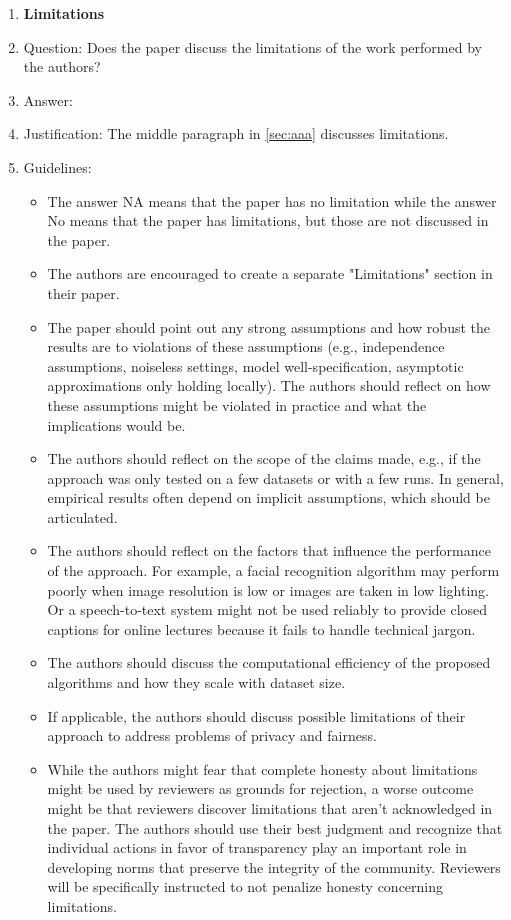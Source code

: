 \documentclass{article}
\theoremstyle{plain}
\theoremstyle{definition}
\theoremstyle{remark}
\theoremstyle{remark}
\begin{document}
\begin{enumerate}
\item {\bf Limitations}
    \item[] Question: Does the paper discuss the limitations of the work performed by the authors?
    \item[] Answer: \answerYes{} %
    \item[] Justification: The middle paragraph in \autoref{sec:aaa} discusses limitations.
    \item[] Guidelines:
    \begin{itemize}
        \item The answer NA means that the paper has no limitation while the answer No means that the paper has limitations, but those are not discussed in the paper. 
        \item The authors are encouraged to create a separate "Limitations" section in their paper.
        \item The paper should point out any strong assumptions and how robust the results are to violations of these assumptions (e.g., independence assumptions, noiseless settings, model well-specification, asymptotic approximations only holding locally). The authors should reflect on how these assumptions might be violated in practice and what the implications would be.
        \item The authors should reflect on the scope of the claims made, e.g., if the approach was only tested on a few datasets or with a few runs. In general, empirical results often depend on implicit assumptions, which should be articulated.
        \item The authors should reflect on the factors that influence the performance of the approach. For example, a facial recognition algorithm may perform poorly when image resolution is low or images are taken in low lighting. Or a speech-to-text system might not be used reliably to provide closed captions for online lectures because it fails to handle technical jargon.
        \item The authors should discuss the computational efficiency of the proposed algorithms and how they scale with dataset size.
        \item If applicable, the authors should discuss possible limitations of their approach to address problems of privacy and fairness.
        \item While the authors might fear that complete honesty about limitations might be used by reviewers as grounds for rejection, a worse outcome might be that reviewers discover limitations that aren't acknowledged in the paper. The authors should use their best judgment and recognize that individual actions in favor of transparency play an important role in developing norms that preserve the integrity of the community. Reviewers will be specifically instructed to not penalize honesty concerning limitations.
    \end{itemize}


\end{enumerate}
\end{document}
